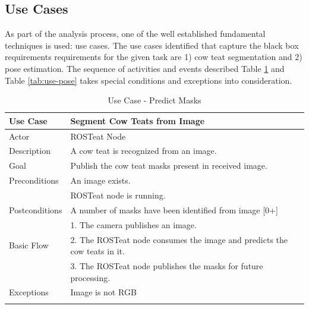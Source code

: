 \subsection{Use Cases}
As part of the analysis process, one of the well established fundamental techniques is used: use cases. The use cases identified that capture the black box requirements requirements for the given task are 1) cow teat segmentation and 2) pose estimation. The sequence of activities and events described Table \ref{tab:use-segment} and Table \ref{tab:use-pose} takes special conditions and exceptions into consideration.

\begin{longtable}{@{} p{3.5cm} p{10.5cm} @{}} \toprule
\textbf{Use Case}       & \textbf{Segment Cow Teats from Image} \\ \midrule
Actor                   & ROSTeat Node \\ \cmidrule{1-2}
Description             & A cow teat is recognized from an image. \\ \cmidrule{1-2}
Goal                    & Publish the cow teat masks present in received image. \\ \cmidrule{1-2}
Preconditions           & An image exists. \\ 
                        & ROSTeat node is running. \\ \cmidrule{1-2} 
Postconditions          & A number of masks have been identified from image [0+]\\ \cmidrule{1-2} 
                        & 1. The camera publishes an image. \\ 
Basic Flow              & 2. The ROSTeat node consumes the image and predicts the cow teats in it. \\
                        & 3. The ROSTeat node publishes the masks for future processing. \\ \cmidrule{1-2}
Exceptions             & Image is not RGB \\ \bottomrule
\caption{Use Case - Predict Masks} \label{tab:use-segment} \\
\end{longtable}

